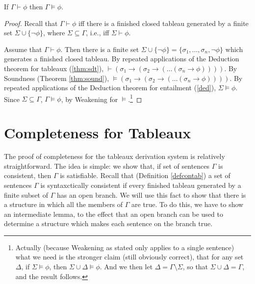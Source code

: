 \begin{theorem}
	If $\Gamma\vdash\phi$ then $\Gamma\vDash\phi$.
\end{theorem}
\begin{proof}
	Recall that $\Gamma\vdash\phi$ iff there is a finished closed tableau generated by a finite set $\Sigma\cup\{\neg\phi\}$, where $\Sigma\subseteq\Gamma$, i.e., iff $\Sigma\vdash\phi$. 
	
	Assume that $\Gamma\vdash\phi$. Then there is a finite set $\Sigma\cup\{¬\phi\} = \{\sigma_{1},…,\sigma_{n},\neg\phi\}$ which generates a finished closed tableau. By repeated applications of the Deduction theorem for tableaux (\autoref{thm:sdt}), $\vdash (\sigma_{1} \to (\sigma_{2} \to ( … (\sigma_{n}\to\phi))))$. By Soundness (Theorem \ref{thm:sound}), $\vDash (\sigma_{1} \to (\sigma_{2} \to ( … (\sigma_{n}\to\phi))))$. By repeated applications of the Deduction theorem for entailment (\autoref{ded}), $\Sigma \vDash\phi$. Since $\Sigma\subseteq\Gamma$, $\Gamma \vDash \phi$, by Weakening for $\vDash$.\footnote{Actually (because Weakening as stated only applies to a single sentence) what we need is the stronger claim (still obviously correct), that for any set $\Delta$, if $\Sigma\vDash\phi$, then $\Sigma \cup \Delta\vDash\phi$. And we then let $\Delta=\Gamma\setminus\Sigma$, so that $\Sigma\cup\Delta=\Gamma$, and the result follows.}
\end{proof}














\section{Completeness for Tableaux}


The proof of completeness for the tableaux derivation system is relatively straightforward. The idea is simple: we show that, if set of sentences $\Gamma$ is consistent, then $\Gamma$ is satisfiable. Recall that (Definition \ref{defcontab}) a set of sentences $\Gamma$ is syntaxctically consistent if every finished tableau generated by a finite subset of $\Gamma$ has an open branch. We will use this fact to show that there is a structure in which all the members of $\Gamma$ are true. To do this, we have to show an intermediate lemma, to the effect that an open branch can be used to determine a structure which makes each sentence on the branch true.


